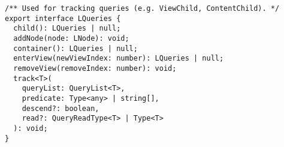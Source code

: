 \begin{verbatim}
/** Used for tracking queries (e.g. ViewChild, ContentChild). */
export interface LQueries {
  child(): LQueries | null;
  addNode(node: LNode): void;
  container(): LQueries | null;
  enterView(newViewIndex: number): LQueries | null;
  removeView(removeIndex: number): void;
  track<T>(
    queryList: QueryList<T>,
    predicate: Type<any> | string[],
    descend?: boolean,
    read?: QueryReadType<T> | Type<T>
  ): void;
}
\end{verbatim}
